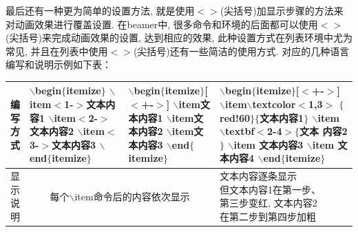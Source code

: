 最后还有一种更为简单的设置方法, 就是使用$<>$(尖括号)加显示步骤的方法来对动画效果进行覆盖设置. 在beamer中, 很多命令和环境的后面都可以使用$<>$(尖括号)来完成动画效果的设置, 达到相应的效果, 此种设置方式在列表环境中尤为常见, 并且在列表中使用$<>$(尖括号)还有一些简洁的使用方式. 对应的几种语言编写和说明示例如下表：\\
\begin{center}
\begin{tabular}{c|l|l|l}
 \hline
  \makecell{编\\写\\方\\式} & \makecell[l]{$\backslash$begin$\{$itemize$\}$\\
	$\backslash$item$<$1-$>$文本内容1\\
	$\backslash$item$<$2-$>$文本内容2\\
	$\backslash$item$<$3-$>$文本内容3\\
	$\backslash$end$\{$itemize$\}$}
 & \makecell[l]{$\backslash$begin$\{$itemize$\}$[$<$+-$>$]\\
	$\backslash$item文本内容1\\
	$\backslash$item文本内容2\\
	$\backslash$item文本内容3\\
	$\backslash$end$\{$itemize$\}$}
  & \makecell[l]{$\backslash$begin$\{$itemize$\}$[$<$+-$>$]\\
	$\backslash$item$\backslash$textcolor$<$1,3$>$\\
$\{$red!60$\}\{$文本内容1$\}$\\
	$\backslash$item $\backslash$textbf$<$2-4$>\{$文本\\内容2$\}$\\
	$\backslash$item \hspace{5pt}文本内容3\\
   $\backslash$item \hspace{5pt}文本内容4\\
	$\backslash$end$\{$itemize$\}$}
\\\hline
 \makecell{显\\示\\说\\明} & \multicolumn{2}{c|}{每个$\backslash$item命令后的内容依次显示} &\makecell[l]{文本内容逐条显示\\但文本内容1在第一步、\\第三步变红, 文本内容2\\在第二步到第四步加粗}  \\\hline
 \end{tabular}
 \end{center}
